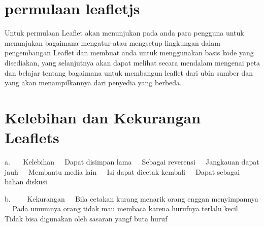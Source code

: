 \section{permulaan leafletjs}
Untuk permulaan Leaflet akan menunjukan pada anda para pengguna untuk menunjukan bagaimana mengatur atau mengsetup lingkungan dalam pengembangan Leaflet dan membuat anda untuk menggunakan basis kode yang disediakan, yang selanjutnya akan dapat melihat secara mendalam mengenai peta dan belajar tentang bagaimana untuk membangun leaflet dari ubin sumber dan yang akan menampilkannya dari penyedia yang berbeda.


\section{Kelebihan dan Kekurangan Leaflets}
a.    Kelebihan
  Dapat disimpan lama
  Sebagai reverensi
  Jangkauan dapat jauh
  Membantu media lain
  Isi dapat dicetak kembali
  Dapat sebagai bahan diskusi

b.     Kekurangan
  Bila cetakan kurang menarik orang enggan menyimpannya
  Pada umumnya orang tidak mau membaca karena hurufnya terlalu kecil
  Tidak bisa digunakan oleh sasaran yangf buta huruf
